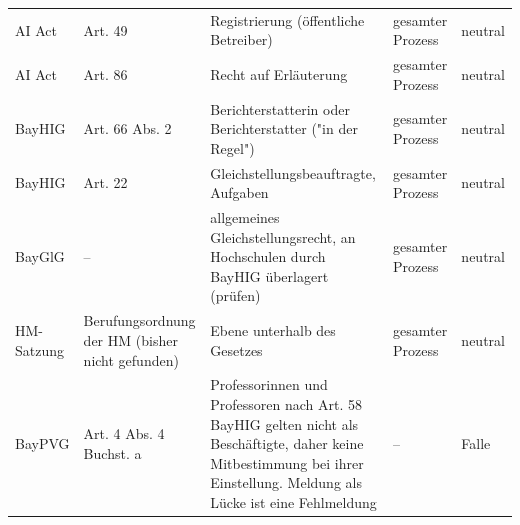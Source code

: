 \begin{small}
\begin{longtable}{@{}>{\raggedright\arraybackslash}p{1.6cm}>{\raggedright\arraybackslash}p{2.6cm}>{\raggedright\arraybackslash}p{5.6cm}>{\raggedright\arraybackslash}p{2.4cm}>{\raggedright\arraybackslash}p{2.0cm}@{}}
AI Act & Art. 49 & Registrierung (öffentliche Betreiber) & gesamter Prozess & neutral \\
AI Act & Art. 86 & Recht auf Erläuterung & gesamter Prozess & neutral \\
BayHIG & Art. 66 Abs. 2 & Berichterstatterin oder Berichterstatter ("in der Regel") & gesamter Prozess & neutral \\
BayHIG & Art. 22 & Gleichstellungsbeauftragte, Aufgaben & gesamter Prozess & neutral \\
BayGlG & -- & allgemeines Gleichstellungsrecht, an Hochschulen durch BayHIG überlagert (prüfen) & gesamter Prozess & neutral \\
HM-Satzung & Berufungsordnung der HM (bisher nicht gefunden) & Ebene unterhalb des Gesetzes & gesamter Prozess & neutral \\
BayPVG & Art. 4 Abs. 4 Buchst. a & Professorinnen und Professoren nach Art. 58 BayHIG gelten nicht als Beschäftigte, daher keine Mitbestimmung bei ihrer Einstellung. Meldung als Lücke ist eine Fehlmeldung & -- & Falle \\
\end{longtable}
\end{small}
